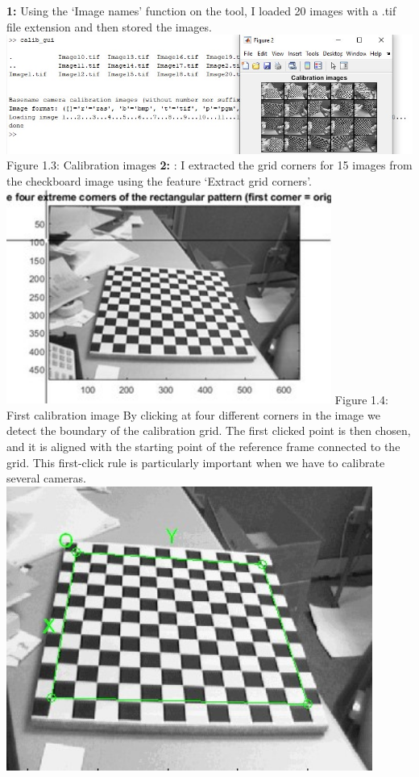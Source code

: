\documentclass[a4paper, 12pt]{report}
\begin{document}
 \newline \newline
\textbf{1:} Using the ‘Image names’ function on the tool, I loaded 20 images with a .tif file extension and then stored the images.\newline 
\includegraphics[width=1.0\textwidth]{resources/image/4.jpg} \newline
Figure 1.3: Calibration images \newline \newline 
\textbf{2:} : I extracted the grid corners for 15 images from the checkboard image using the feature ‘Extract grid corners'. \newline
\includegraphics[width=0.8\textwidth]{resources/image/5.jpg} \newline
Figure 1.4: First calibration image \newline
By clicking at four different corners in the image we detect the boundary of the calibration grid. The first clicked point is then chosen, and it is aligned with the starting point of the reference frame connected to the grid. This first-click rule is particularly important when we have to calibrate several cameras. \newline
\includegraphics[width=0.9\textwidth]{resources/image/6.jpg} \newline
\end{document}

